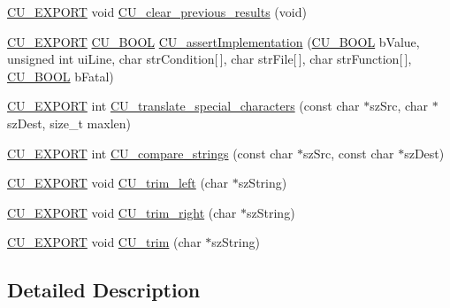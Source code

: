 \begin{DoxyCompactItemize}
\item 
\hyperlink{group___framework_ga22e538403fdee24be3388ab473fe64d5}{C\+U\+\_\+\+E\+X\+P\+O\+R\+T} void \hyperlink{group___framework_ga7c9c2263c915119ce0e5b835b2a30c07}{C\+U\+\_\+clear\+\_\+previous\+\_\+results} (void)
\item 
\hyperlink{group___framework_ga22e538403fdee24be3388ab473fe64d5}{C\+U\+\_\+\+E\+X\+P\+O\+R\+T} \hyperlink{group___framework_gabd98d449e979a6379b06551242106dd4}{C\+U\+\_\+\+B\+O\+O\+L} \hyperlink{group___framework_gad409fc536d9d3fb5f659c76421e8ce3b}{C\+U\+\_\+assert\+Implementation} (\hyperlink{group___framework_gabd98d449e979a6379b06551242106dd4}{C\+U\+\_\+\+B\+O\+O\+L} b\+Value, unsigned int ui\+Line, char str\+Condition\mbox{[}$\,$\mbox{]}, char str\+File\mbox{[}$\,$\mbox{]}, char str\+Function\mbox{[}$\,$\mbox{]}, \hyperlink{group___framework_gabd98d449e979a6379b06551242106dd4}{C\+U\+\_\+\+B\+O\+O\+L} b\+Fatal)
\item 
\hyperlink{group___framework_ga22e538403fdee24be3388ab473fe64d5}{C\+U\+\_\+\+E\+X\+P\+O\+R\+T} int \hyperlink{group___framework_ga8d188810eb1901d4e7e740f109645404}{C\+U\+\_\+translate\+\_\+special\+\_\+characters} (const char $\ast$sz\+Src, char $\ast$sz\+Dest, size\+\_\+t maxlen)
\item 
\hyperlink{group___framework_ga22e538403fdee24be3388ab473fe64d5}{C\+U\+\_\+\+E\+X\+P\+O\+R\+T} int \hyperlink{group___framework_gab88ddd1b0e508bf6210808d34285659e}{C\+U\+\_\+compare\+\_\+strings} (const char $\ast$sz\+Src, const char $\ast$sz\+Dest)
\item 
\hyperlink{group___framework_ga22e538403fdee24be3388ab473fe64d5}{C\+U\+\_\+\+E\+X\+P\+O\+R\+T} void \hyperlink{group___framework_gade303bc81f692aa882189eb14484be8f}{C\+U\+\_\+trim\+\_\+left} (char $\ast$sz\+String)
\item 
\hyperlink{group___framework_ga22e538403fdee24be3388ab473fe64d5}{C\+U\+\_\+\+E\+X\+P\+O\+R\+T} void \hyperlink{group___framework_ga728a4e98bd73682b97cede1429547d6d}{C\+U\+\_\+trim\+\_\+right} (char $\ast$sz\+String)
\item 
\hyperlink{group___framework_ga22e538403fdee24be3388ab473fe64d5}{C\+U\+\_\+\+E\+X\+P\+O\+R\+T} void \hyperlink{group___framework_gab4f507101595640f759647d13f0e0a00}{C\+U\+\_\+trim} (char $\ast$sz\+String)
\end{DoxyCompactItemize}


\subsection{Detailed Description}


